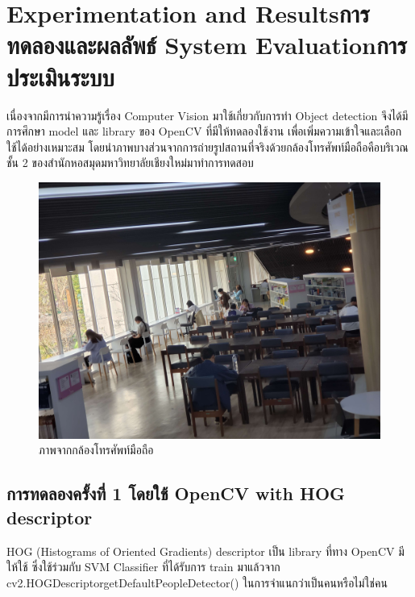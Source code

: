 \chapter{\ifproject%
\ifenglish Experimentation and Results\else การทดลองและผลลัพธ์\fi
\else%
\ifenglish System Evaluation\else การประเมินระบบ\fi
\fi}

\hspace{10mm} เนื่องจากมีการนำความรู้เรื่อง Computer Vision มาใช้เกี่ยวกับการทำ Object detection จึงได้มีการศึกษา model และ library
ของ OpenCV ที่มีให้ทดลองใช้งาน เพื่อเพิ่มความเข้าใจและเลือกใช้ได้อย่างเหมาะสม โดยนำภาพบางส่วนจากการถ่ายรูปสถานที่จริงด้วยกล้องโทรศัพท์มือถือคือบริเวณชั้น 2
ของสำนักหอสมุดมหาวิทยาลัยเชียงใหม่มาทำการทดสอบ

\begin{figure}[h]
    \centering
    \includegraphics[scale=0.07]{images/cam2-2.jpg}
    \caption[camera]{ภาพจากกล้องโทรศัพท์มือถือ}
    \label{fig:camera}
\end{figure}

\section{การทดลองครั้งที่ 1 โดยใช้ OpenCV with HOG descriptor}

\hspace{10mm}HOG (Histograms of Oriented Gradients) descriptor เป็น library ที่ทาง OpenCV มีให้ใช้
ซึ่งใช้ร่วมกับ SVM Classifier ที่ได้รับการ train มาแล้วจาก cv2.HOGDescriptor\textunderscore getDefaultPeopleDetector()
ในการจำแนกว่าเป็นคนหรือไม่ใช่คน

